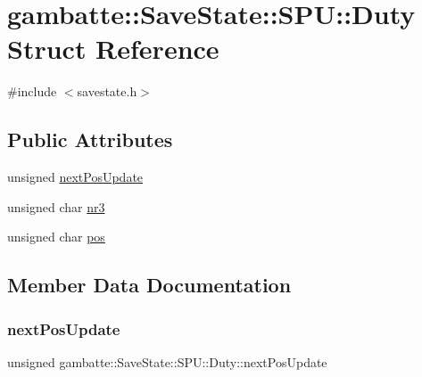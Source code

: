 \hypertarget{structgambatte_1_1SaveState_1_1SPU_1_1Duty}{}\section{gambatte\+:\+:Save\+State\+:\+:S\+PU\+:\+:Duty Struct Reference}
\label{structgambatte_1_1SaveState_1_1SPU_1_1Duty}


{\ttfamily \#include $<$savestate.\+h$>$}

\subsection*{Public Attributes}
\begin{DoxyCompactItemize}
\item 
unsigned \hyperlink{structgambatte_1_1SaveState_1_1SPU_1_1Duty_af1473ee6968edd869d1671b03ecf08d9}{next\+Pos\+Update}
\item 
unsigned char \hyperlink{structgambatte_1_1SaveState_1_1SPU_1_1Duty_ab9ac47f140374c4e3a0ee57aa453e1e5}{nr3}
\item 
unsigned char \hyperlink{structgambatte_1_1SaveState_1_1SPU_1_1Duty_ad58b798555389e0cb08e75307b6c8fce}{pos}
\end{DoxyCompactItemize}


\subsection{Member Data Documentation}
\mbox{\label{structgambatte_1_1SaveState_1_1SPU_1_1Duty_af1473ee6968edd869d1671b03ecf08d9}} 
\subsubsection{\texorpdfstring{next\+Pos\+Update}{nextPosUpdate}}
{\footnotesize\ttfamily unsigned gambatte\+::\+Save\+State\+::\+S\+P\+U\+::\+Duty\+::next\+Pos\+Update}

\mbox{\label{structgambatte_1_1SaveState_1_1SPU_1_1Duty_ab9ac47f140374c4e3a0ee57aa453e1e5}} 
